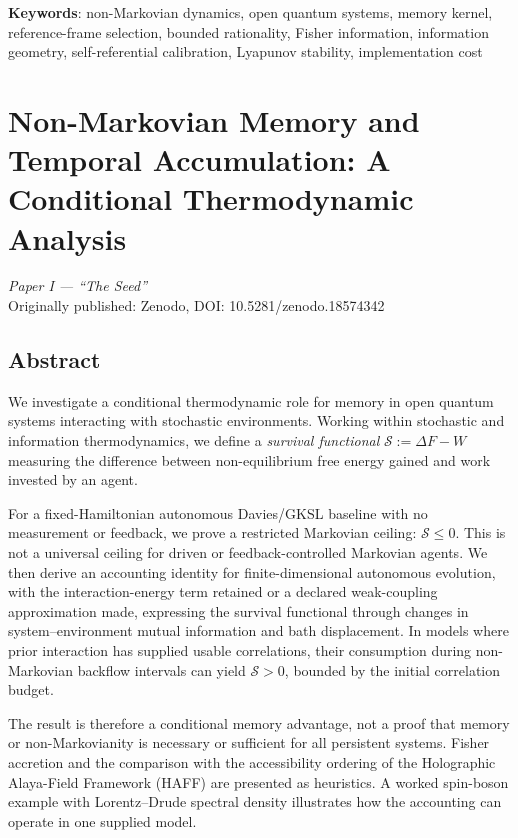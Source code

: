 \documentclass[12pt,a4paper,openany]{book}
\begin{document}
\bigskip
\noindent\textbf{Keywords}: non-Markovian dynamics, open quantum systems, memory kernel, reference-frame selection, bounded rationality, Fisher information, information geometry, self-referential calibration, Lyapunov stability, implementation cost

\tableofcontents

\mainmatter

\chapter{Non-Markovian Memory and Temporal Accumulation: A Conditional Thermodynamic Analysis}
\label{chap:paperI}

\begin{center}
\textit{Paper I --- ``The Seed''}\\[0.5em]
Originally published: Zenodo, DOI: 10.5281/zenodo.18574342
\end{center}

\bigskip

\section*{Abstract}
We investigate a conditional thermodynamic role for memory in open
quantum systems interacting with stochastic environments.  Working
within stochastic and information thermodynamics, we define a
\emph{survival functional} $\mathcal{S}:=\Delta F-W$ measuring the
difference between non-equilibrium free energy gained and work invested
by an agent.

For a fixed-Hamiltonian autonomous Davies/GKSL baseline with no
measurement or feedback, we prove a restricted Markovian ceiling:
$\mathcal{S}\leq0$.  This is not a universal ceiling for driven or
feedback-controlled Markovian agents.  We then derive an accounting
identity for finite-dimensional autonomous evolution, with the
interaction-energy term retained or a declared weak-coupling
approximation made, expressing the survival functional through changes
in system--environment mutual information and bath displacement.  In
models where prior interaction has supplied usable correlations, their
consumption during non-Markovian backflow intervals can yield
$\mathcal{S}>0$, bounded by the initial correlation budget.

The result is therefore a conditional memory advantage, not a proof that
memory or non-Markovianity is necessary or sufficient for all persistent
systems.  Fisher accretion and the comparison with the accessibility
ordering of the Holographic Alaya-Field Framework (HAFF) are presented
as heuristics.  A worked spin-boson example with Lorentz--Drude spectral
density illustrates how the accounting can operate in one supplied
model.
\end{document}
